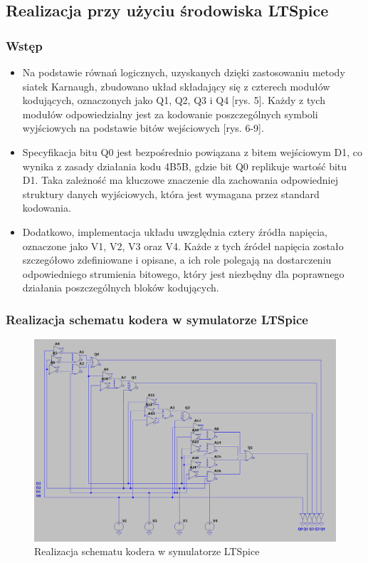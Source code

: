 \documentclass{article}
\begin{document}
\subsection{Realizacja przy użyciu środowiska LTSpice}
\subsubsection{Wstęp}
\begin{itemize}
\item Na podstawie równań logicznych, uzyskanych dzięki zastosowaniu metody siatek Karnaugh, zbudowano układ składający się z czterech modułów kodujących, oznaczonych jako Q1, Q2, Q3 i Q4 [rys. 5]. Każdy z tych modułów odpowiedzialny jest za kodowanie poszczególnych symboli wyjściowych na podstawie bitów wejściowych [rys. 6-9].

\item Specyfikacja bitu Q0 jest bezpośrednio powiązana z bitem wejściowym D1, co wynika z zasady działania kodu 4B5B, gdzie bit Q0 replikuje wartość bitu D1. Taka zależność ma kluczowe znaczenie dla zachowania odpowiedniej struktury danych wyjściowych, która jest wymagana przez standard kodowania.

\item Dodatkowo, implementacja układu uwzględnia cztery źródła napięcia, oznaczone jako V1, V2, V3 oraz V4. Każde z tych źródeł napięcia zostało szczegółowo zdefiniowane i opisane, a ich role polegają na dostarczeniu odpowiedniego strumienia bitowego, który jest niezbędny dla poprawnego działania poszczególnych bloków kodujących.
\end{itemize}

\subsubsection{Realizacja schematu kodera w symulatorze LTSpice}
\begin{figure}[H]
    \centering
    \begin{adjustbox}{center}
        \includegraphics[width=1\textwidth]{ltspice-4b5b.png}
    \end{adjustbox}
    \caption{Realizacja schematu kodera w symulatorze LTSpice}
    \label{fig:mojobrazek}
\end{figure}
\end{document}
